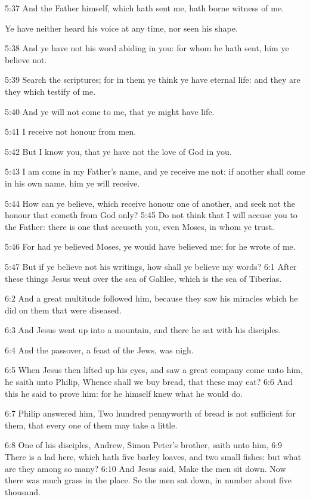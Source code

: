5:37 And the Father himself, which hath sent me, hath borne witness of me.

Ye have neither heard his voice at any time, nor seen his shape.

5:38 And ye have not his word abiding in you: for whom he hath sent, him ye believe not.

5:39 Search the scriptures; for in them ye think ye have eternal life: and they are they which testify of me.

5:40 And ye will not come to me, that ye might have life.

5:41 I receive not honour from men.

5:42 But I know you, that ye have not the love of God in you.

5:43 I am come in my Father's name, and ye receive me not: if another shall come in his own name, him ye will receive.

5:44 How can ye believe, which receive honour one of another, and seek not the honour that cometh from God only?  5:45 Do not think that I will accuse you to the Father: there is one that accuseth you, even Moses, in whom ye trust.

5:46 For had ye believed Moses, ye would have believed me; for he wrote of me.

5:47 But if ye believe not his writings, how shall ye believe my words?  6:1 After these things Jesus went over the sea of Galilee, which is the sea of Tiberias.

6:2 And a great multitude followed him, because they saw his miracles which he did on them that were diseased.

6:3 And Jesus went up into a mountain, and there he sat with his disciples.

6:4 And the passover, a feast of the Jews, was nigh.

6:5 When Jesus then lifted up his eyes, and saw a great company come unto him, he saith unto Philip, Whence shall we buy bread, that these may eat?  6:6 And this he said to prove him: for he himself knew what he would do.

6:7 Philip answered him, Two hundred pennyworth of bread is not sufficient for them, that every one of them may take a little.

6:8 One of his disciples, Andrew, Simon Peter's brother, saith unto him, 6:9 There is a lad here, which hath five barley loaves, and two small fishes: but what are they among so many?  6:10 And Jesus said, Make the men sit down. Now there was much grass in the place. So the men sat down, in number about five thousand.

